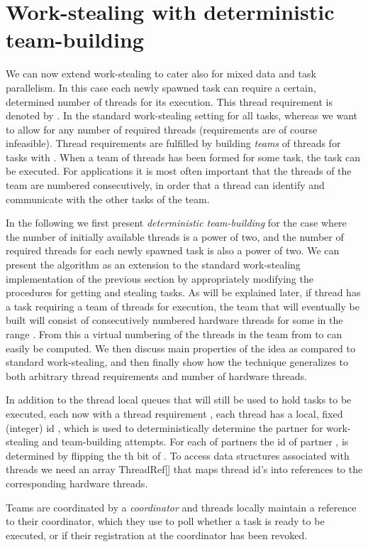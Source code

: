 \documentclass[preprint]{sigplanconf}
\begin{document}
\section{Work-stealing with deterministic team-building}

We can now extend work-stealing to cater also for mixed data and task
parallelism. In this case each newly spawned task can require a
certain, determined number of threads for its execution. This thread
requirement is denoted by . In the standard work-stealing setting
 for all tasks, whereas we want to allow for any 
number of required threads (requirements  are of course
infeasible). Thread requirements are fulfilled by building
\emph{teams} of threads for tasks with . When a team of 
threads has been formed for some task, the task can be executed. For
applications it is most often important that the threads of the team are
numbered consecutively, in order that a thread can identify and communicate
with the other tasks of the team. 

In the following we first present \emph{deterministic team-building}
for the case where the number of initially available threads is
a power of two, and the number of required threads for each
newly spawned task is also a power of two. We can present the
algorithm as an extension to the standard work-stealing implementation
of the previous section by appropriately modifying the procedures for
getting and stealing tasks.  As will be explained later, if thread 
has a task requiring a team of  threads for execution, the team
that will eventually be built will consist of consecutively numbered
hardware threads  for some  in
the range . From this a virtual numbering of the
threads in the team from  to  can easily be computed.  We then
discuss main properties of the idea as compared to standard
work-stealing, and then finally show how the technique generalizes to
both arbitrary thread requirements and number of hardware threads.

In addition to the thread local queues  that will still be used to
hold tasks to be executed, each now with a thread requirement , each thread has a local, fixed (integer) id , which is used to
deterministically determine the partner for work-stealing and
team-building attempts. For each of  partners the id of
partner ,  is determined by flipping the th bit
of . To access data structures associated with threads we need 
an array ThreadRef[] that maps thread id's into references
to the corresponding hardware threads.

Teams are coordinated by a \emph{coordinator} and threads locally
maintain a reference  to their coordinator, which they use to poll
whether a task is ready to be executed, or if their registration at
the coordinator has been revoked.
\end{document}

